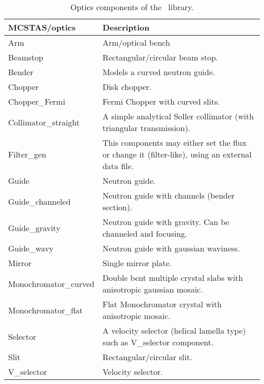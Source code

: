 \begin{table}
  \begin{center}
    {\let\my=\\
    \begin{tabular}{|p{}|p{}|}
      \hline
       MCSTAS/optics & Description \\
       \hline
Arm                &  Arm/optical bench \\
 Beamstop          &   Rectangular/circular
                      beam stop. \\
 Bender            &   Models a curved
                      neutron guide. \\
 Chopper           &   Disk chopper. \\
 Chopper\_Fermi     &   Fermi Chopper with
                      curved slits. \\
 Collimator\_straight &  A simple analytical Soller collimator
                      (with triangular
                      transmission).  \\
 Filter\_gen        &   This components may
                      either set the flux
                      or change it (filter-like), using
                      an external data
                      file. \\
 Guide             &   Neutron guide. \\
 Guide\_channeled   &   Neutron guide with
                      channels (bender
                      section). \\
 Guide\_gravity     &  Neutron guide with gravity. Can be
                      channeled and focusing. \\

 Guide\_wavy        &   Neutron guide with
                      gaussian waviness. \\

 Mirror             &  Single mirror plate. \\

                      
 Monochromator\_curved & Double bent multiple crystal
                      slabs with anisotropic gaussian
                      mosaic. \\

 Monochromator\_flat &  Flat Monochromator
                      crystal with
                      anisotropic mosaic. \\

 Selector            & A velocity selector
                      (helical lamella
                      type) such as
                      V\_selector component. \\

 Slit                & Rectangular/circular
                      slit. \\

 V\_selector          & Velocity selector. \\
      \hline
    \end{tabular}
    \caption{Optics components of the \MCS\ library.}
    \label{t:comp-optics}
    }
  \end{center}
\end{table}

